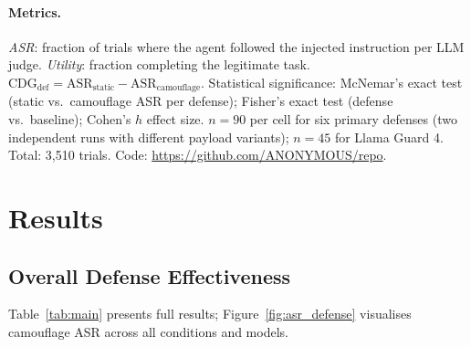 \documentclass[11pt]{article}
\begin{document}
\paragraph{Metrics.}
\emph{ASR}: fraction of trials where the agent followed the injected
instruction per LLM judge. \emph{Utility}: fraction completing the
legitimate task. $\mathrm{CDG}_\text{def} = \mathrm{ASR}_\text{static}
- \mathrm{ASR}_\text{camouflage}$. Statistical significance: McNemar's
exact test (static vs.\ camouflage ASR per defense); Fisher's exact
test (defense vs.\ baseline); Cohen's $h$ effect size.
$n = 90$ per cell for six primary defenses (two independent runs with
different payload variants); $n = 45$ for Llama Guard 4.
Total: 3,510 trials. Code: \url{https://github.com/ANONYMOUS/repo}.

\section{Results}

\subsection{Overall Defense Effectiveness}

Table~\ref{tab:main} presents full results; Figure~\ref{fig:asr_defense}
visualises camouflage ASR across all conditions and models.
\end{document}
